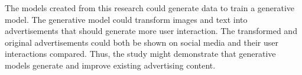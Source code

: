 \documentclass{article}
\begin{document}
The models created from this research could generate data to train a generative model.  The generative model could transform images and text into advertisements that should generate more user interaction.  The transformed and original advertisements could both be shown on social media and their user interactions compared. Thus, the study might demonstrate that generative models generate and improve existing advertising content.


   
 
\end{document}
